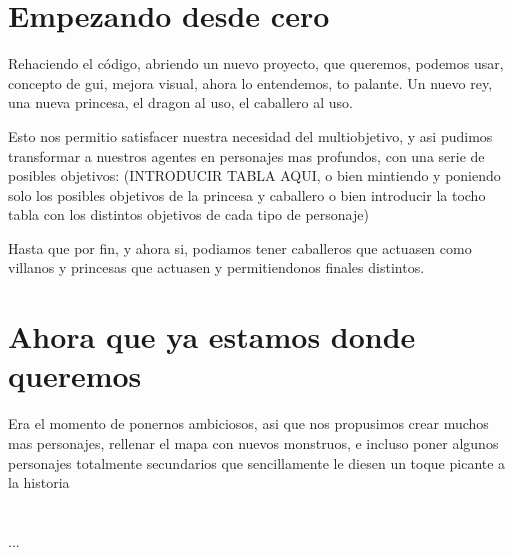 \section{Empezando desde cero}

Rehaciendo el c\'odigo, abriendo un nuevo proyecto, que queremos, podemos usar, concepto de gui, mejora visual, ahora lo entendemos, to palante. 
Un nuevo rey, una nueva princesa, el dragon al uso, el caballero al uso.

Esto nos permitio satisfacer nuestra necesidad del multiobjetivo, y asi pudimos transformar a nuestros agentes en personajes mas profundos, con una serie de posibles objetivos:
(INTRODUCIR TABLA AQUI, o bien mintiendo y poniendo solo los posibles objetivos de la princesa y caballero o bien introducir la tocho tabla con los distintos objetivos de cada tipo de personaje)

Hasta que por fin, y ahora si, podiamos tener caballeros que actuasen como villanos y princesas que actuasen y permitiendonos finales distintos.


\section{Ahora que ya estamos donde queremos}
Era el momento de ponernos ambiciosos, asi que nos propusimos crear muchos mas personajes, rellenar el mapa con nuevos monstruos, e incluso poner algunos personajes totalmente secundarios que sencillamente le diesen un toque picante a la historia


\section*{\ProximoCapitulo}
\TocProximoCapitulo

...




